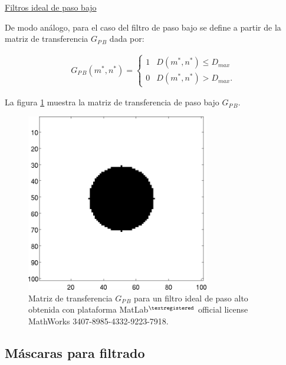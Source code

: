 \begin{center}
\underline{Filtros ideal de paso bajo}
\end{center}

De modo an\'alogo, para el caso del filtro de paso bajo se define a partir de la matriz de transferencia $G_{P\,B}$ dada por:

\begin{eqnarray}
	G_{P\,B}(m^*, n^*) = \left\{ \begin{array}{ll}
	1 & \mbox{$D(m^*, n^*) \leq D_{max}$}\\
	0 & \mbox{$D(m^*, n^*) > D_{max}$}.\end{array} \right.
\label{EqLXVIII}
\end{eqnarray}

La figura \ref{Fig2_9} muestra la matriz de transferencia de paso bajo $G_{P\,B}$.

\begin{center}
\begin{figure} [!h]

\centering
\includegraphics[width=8cm]{figures/Fig2_9.png}

\caption{Matriz de transferencia $G_{P\,B}$ para un filtro ideal de paso alto
         obtenida con plataforma MatLab$^{\textregistered}$ official license MathWorks 3407-8985-4332-9223-7918.}
\label{Fig2_9}

\end{figure}
\end{center}

\subsection{M\'ascaras para filtrado}

